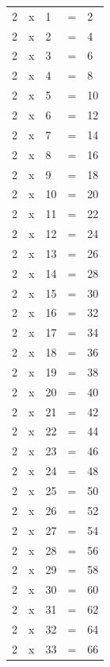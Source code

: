\documentclass[
  12pt,		%
  a4paper,	%
  openright,%
  oneside,	%
  chapter=TITLE,		%
  section=TITLE,		%
  english,	%
  french,	%
  spanish,	%
  brazil
]{abntex2}
\begin{document}
\begin{longtable}{p{}p{}p{}p{}p{}}
                2 & x & 1  & = & 2   \\
                2 & x & 2  & = & 4   \\
                2 & x & 3  & = & 6   \\
                2 & x & 4  & = & 8   \\
                2 & x & 5  & = & 10  \\
                2 & x & 6  & = & 12  \\
                2 & x & 7  & = & 14  \\
                2 & x & 8  & = & 16  \\
                2 & x & 9  & = & 18  \\
                2 & x & 10 & = & 20  \\
                2 & x & 11 & = & 22  \\
                2 & x & 12 & = & 24  \\
                2 & x & 13 & = & 26  \\
                2 & x & 14 & = & 28  \\
                2 & x & 15 & = & 30  \\
                2 & x & 16 & = & 32  \\
                2 & x & 17 & = & 34  \\
                2 & x & 18 & = & 36  \\
                2 & x & 19 & = & 38  \\
                2 & x & 20 & = & 40  \\
                2 & x & 21 & = & 42  \\
                2 & x & 22 & = & 44  \\
                2 & x & 23 & = & 46  \\
                2 & x & 24 & = & 48  \\
                2 & x & 25 & = & 50  \\
                2 & x & 26 & = & 52  \\
                2 & x & 27 & = & 54  \\
                2 & x & 28 & = & 56  \\
                2 & x & 29 & = & 58  \\
                2 & x & 30 & = & 60  \\
                2 & x & 31 & = & 62  \\
                2 & x & 32 & = & 64  \\
                2 & x & 33 & = & 66  \\

\end{longtable}
\end{document}
